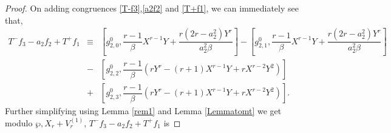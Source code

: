 \documentclass[11pt, reqno]{amsart}
\numberwithin{equation}{section}
\theoremstyle{definition}
\theoremstyle{remark}
\theoremstyle{definition}
\theoremstyle{remark}
\theoremstyle{remark}
\begin{document}
\begin{proof}

On adding congruences \eqref{T-f3},\eqref{a2f2} and \eqref{T+f1}, we can immediately see that, 
\begin{eqnarray}\label{sumrad2}
    T^{-}f_3-a_2f_2+T^+f_{1} &\equiv& %
    \left[g_{2,0}^0, \dfrac{r-1}{\beta}X^{r-1}Y + \dfrac{r(2r-a_2^2)Y^r}{a_2^2\beta}\right]- \left[g_{2,1}^0, \dfrac{r-1}{\beta}X^{r-1}Y + \dfrac{r(2r-a_2^2)Y^r}{a_2^2\beta}\right] \nonumber\\   
&- &\left[g_{2,2}^0, \dfrac{r-1}{\beta}\left(rY^{r}-(r+1)X^{r-1}Y+rX^{r-2}Y^2\right)\right] \\
& +& \left[g_{2,3}^0, \dfrac{r-1}{\beta}\left(rY^{r}-(r+1)X^{r-1}Y+rX^{r-2}Y^2\right)\right].\nonumber
\end{eqnarray}
Further simplifying using Lemma \ref{rem1} and Lemma \ref{Lemmatomt} we get modulo $\wp,X_{r}+V_{r}^{(1)}$, $T^{-}f_3-a_2f_2+T^+f_{1}$ is %

\end{proof}
\end{document}
